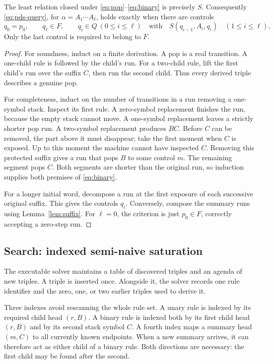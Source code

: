 \begin{theorem}
\label{thm:pop-exact}
The least relation closed under \eqref{eq:pop}--\eqref{eq:binary} is precisely
$S$. Consequently \eqref{eq:pds-query}, for
$\alpha=A_1\cdots A_\ell$, holds exactly when there are controls
\[
 q_0=p_0,\qquad q_\ell\in F,\qquad q_i\in Q\ (0\leq i\leq\ell)
 \quad\text{with}\quad S(q_{i-1},A_i,q_i)\quad(1\leq i\leq\ell),
\]
Only the last control is required to belong to $F$.
\end{theorem}
\begin{proof}
For soundness, induct on a finite derivation. A pop is a real transition. A
one-child rule is followed by the child's run. For a two-child rule, lift the
first child's run over the suffix $C$, then run the second child. Thus every
derived triple describes a genuine pop.

For completeness, induct on the number of transitions in a run removing a
one-symbol stack. Inspect its first rule. A zero-symbol replacement finishes
the run, because the empty stack cannot move. A one-symbol replacement leaves
a strictly shorter pop run. A two-symbol replacement produces $BC$. Before
$C$ can be removed, the part above it must disappear; take the first moment
when $C$ is exposed. Up to this moment the machine cannot have inspected $C$.
Removing this protected suffix gives a run that pops $B$ to some control $m$.
The remaining segment pops $C$. Both segments are shorter than the original
run, so induction supplies both premises of \eqref{eq:binary}.

For a longer initial word, decompose a run at the first exposure of each
successive original suffix. This gives the controls $q_i$. Conversely, compose
the summary runs using Lemma~\ref{lem:suffix}. For $\ell=0$, the criterion is
just $p_0\in F$, correctly accepting a zero-step run.
\end{proof}

\subsection{Search: indexed semi-naive saturation}
The executable solver maintains a table of discovered triples and an agenda of
new triples. A triple is inserted once. Alongside it, the solver records one
rule identifier and the zero, one, or two earlier triples used to derive it.

Three indexes avoid rescanning the whole rule set. A unary rule is indexed by
its required child head $(r,B)$. A binary rule is indexed both by its first
child head $(r,B)$ and by its second stack symbol $C$. A fourth index maps a
summary head $(m,C)$ to all currently known endpoints. When a new summary
arrives, it can therefore act as either child of a binary rule. Both directions
are necessary: the first child may be found after the second.

